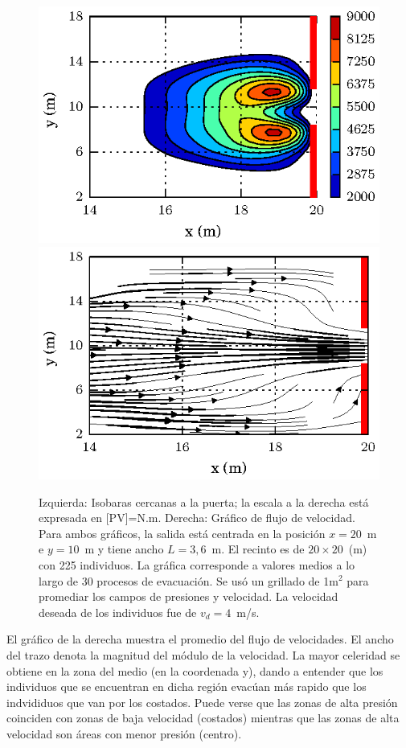 \begin{figure}[H]
    \centering
    \includegraphics[scale=1]{figuras/press_225p_v4_onedoor_3_6.eps}
        \includegraphics[scale=1]{figuras/flujo_door_3_6m.eps}
    \caption[width=5cm]{Izquierda: Isobaras cercanas a la puerta; la escala a la derecha está expresada en [PV]=N.m. Derecha: Gráfico de flujo de velocidad. Para ambos gráficos, la salida está centrada en la posición $x=20$~m e $y=10$~m y tiene ancho $L=3,6$~m. El recinto es de $20\times 20$~(m) con 225 individuos. La gráfica corresponde a valores medios a lo largo de 30 procesos de evacuación. Se usó un grillado de 1m$^2$ para promediar los campos de presiones y velocidad. La velocidad deseada de los individuos fue de $v_d=4$~m/s.}
    \label{isobaras_flujo_3_6m}
\end{figure}

El gráfico de la derecha muestra el promedio del flujo de velocidades. El ancho del trazo denota la magnitud del módulo de la velocidad. La mayor celeridad se obtiene en la zona del medio (en la coordenada y), dando a entender que los individuos que se encuentran en dicha región evacúan más rapido que los indvididuos que van por los costados. 
Puede verse que las zonas de alta presión coinciden con zonas de baja velocidad (costados) mientras que las zonas de alta velocidad son áreas con menor presión (centro). 

